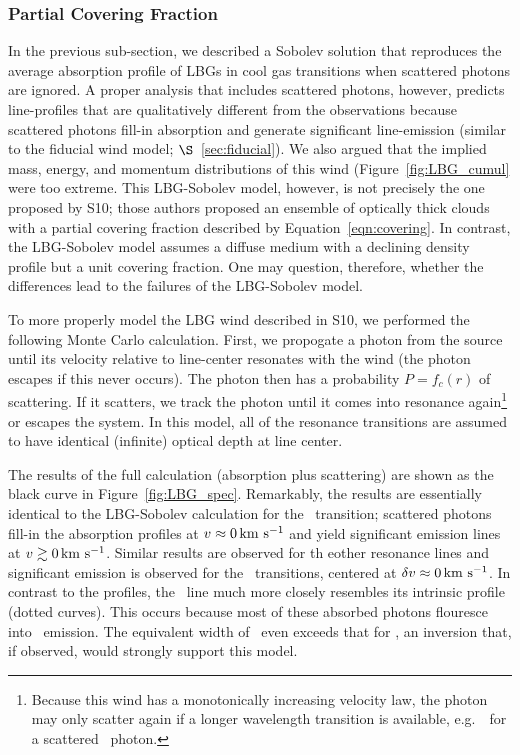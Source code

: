 \documentclass[12pt,preprint]{aastex}
\begin{document}
\subsubsection{Partial Covering Fraction}
\label{sec:Covering}

In the previous sub-section, we described a Sobolev solution that
reproduces the average absorption profile of LBGs in cool gas
transitions when scattered photons are ignored.  A proper analysis
that includes scattered photons,
however, predicts line-profiles that are qualitatively
different from the observations because scattered photons fill-in
absorption and generate significant line-emission (similar to the
fiducial wind model; $\S$~\ref{sec:fiducial}).
We also argued that the implied mass, energy, and momentum
distributions of this wind (Figure~\ref{fig:LBG_cumul} were too
extreme. 
This LBG-Sobolev model, however, is not precisely
the one proposed by S10;  those authors proposed an ensemble of optically
thick clouds with a partial covering fraction described by
Equation~\ref{eqn:covering}.  In contrast, the LBG-Sobolev model assumes
a diffuse medium with a declining density profile but a unit covering
fraction.  One may question, therefore,  whether the differences
lead to the failures of the LBG-Sobolev model. 

To more properly model the LBG wind described in S10, we 
performed the following Monte Carlo calculation.  First, we propogate
a photon from the source until its velocity relative to line-center
resonates with the wind (the photon escapes if this never occurs).
The photon then has a probability $P = f_c(r)$ of scattering.  If it
scatters, we track the photon until it comes into
resonance again\footnote{Because this wind has a monotonically
  increasing velocity law, the photon may only scatter again if a
  longer wavelength transition is available, e.g.\ \mgiib\ for a
  scattered \mgiia\ photon.} or escapes the system.  In this model, all of the
resonance transitions are assumed to have identical (infinite) optical
depth at line center. 

The results of the full calculation (absorption plus scattering) are
shown as the black curve in Figure~\ref{fig:LBG_spec}.  Remarkably, the results
are essentially identical to the LBG-Sobolev calculation for the
\mgiia\ transition; scattered photons fill-in
the absorption profiles at $v \approx 0 \, {\rm km~s^{-1}}$ and yield significant
emission lines at $v \gtrsim 0 \, {\rm km~s^{-1}}$. 
Similar results are observed for th eother resonance lines and  
significant emission is observed 
for the \feiis\ transitions, centered at $\delta v \approx 0 \, {\rm km~s^{-1}}$.  
In contrast to the  profiles, the 
\feiia\ line much more closely resembles its intrinsic
profile (dotted curves).  This occurs because most of these
absorbed photons flouresce into \feiis\ emission.
The equivalent width of \feiia\ even exceeds that for \feiib, an
inversion that, if observed, would strongly support this model.
\end{document}
